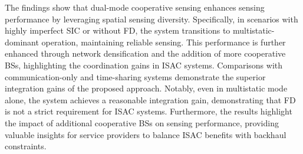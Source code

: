 \documentclass[journal]{IEEEtran}
\begin{document}
The findings show that dual-mode cooperative sensing enhances sensing performance by leveraging spatial sensing diversity. Specifically, in scenarios with highly imperfect SIC or without FD, the system transitions to multistatic-dominant operation, maintaining reliable sensing. This performance is further enhanced through network densification and the addition of more cooperative BSs, highlighting the coordination gains in ISAC systems. Comparisons with communication-only and time-sharing systems demonstrate the superior integration gains of the proposed approach. Notably, even in multistatic mode alone, the system achieves a reasonable integration gain, demonstrating that FD is not a strict requirement for ISAC systems. Furthermore, the results highlight the impact of additional cooperative BSs on sensing performance, providing valuable insights for service providers to balance ISAC benefits with backhaul constraints.










\appendices
\end{document}
